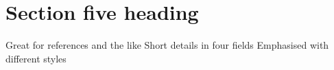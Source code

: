 \section{Section five heading}

 	 {Great for references and the like}
 	 {Short details in four fields}
 	 {Emphasised with different styles}
